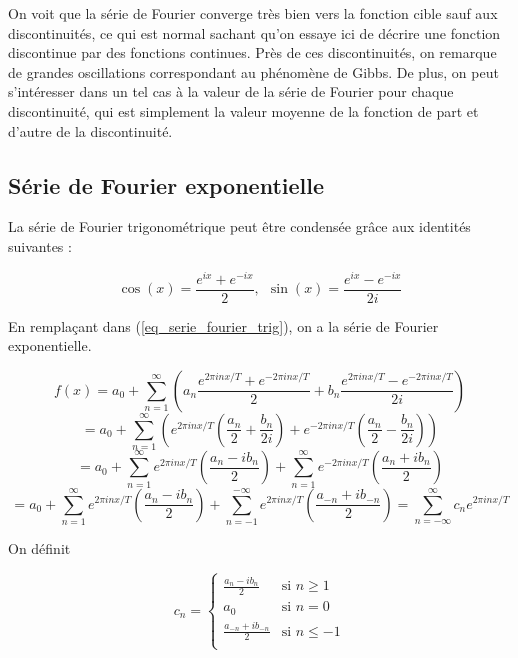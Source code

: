 On voit que la série de Fourier converge très bien vers la fonction cible sauf aux discontinuités, ce qui est normal sachant qu'on essaye ici de décrire une fonction discontinue par des fonctions continues. Près de ces discontinuités, on remarque de grandes oscillations correspondant au phénomène de Gibbs. De plus, on peut s'intéresser dans un tel cas à la valeur de la série de Fourier pour chaque discontinuité, qui est simplement la valeur moyenne de la fonction de part et d'autre de la discontinuité. 

\subsection{Série de Fourier exponentielle}
La série de Fourier trigonométrique peut être condensée grâce aux identités suivantes :

\begin{equation*}
    \cos(x) = \frac{e^{ix} + e^{-ix}}{2}, \ \ \sin(x) = \frac{e^{ix} - e^{-ix}}{2i}
\end{equation*}

En remplaçant dans (\ref{eq_serie_fourier_trig}), on a la série de Fourier exponentielle.

\begin{equation*}
    f(x) = a_0 + \sum_{n=1}^{\infty}\left(a_n \frac{e^{2\pi inx/T} + e^{-2\pi inx/T}}{2} + b_n \frac{e^{2\pi inx/T} - e^{-2\pi inx/T}}{2i}\right)
\end{equation*}
\begin{equation*}
    = a_0 + \sum_{n=1}^{\infty}\left(e^{2\pi inx/T}\left(\frac{a_n}{2} + \frac{b_n}{2i}\right) + e^{-2\pi inx/T}\left(\frac{a_n}{2} - \frac{b_n}{2i}\right)\right)
\end{equation*}
\begin{equation*}
    = a_0 + \sum_{n=1}^{\infty}e^{2\pi inx/T}\left(\frac{a_n - ib_n}{2}\right) + \sum_{n=1}^{\infty}e^{-2\pi inx/T}\left(\frac{a_n + ib_n}{2}\right)
\end{equation*}
\begin{equation}
    = a_0 + \sum_{n=1}^{\infty}e^{2\pi inx/T}\left(\frac{a_n - ib_n}{2}\right) + \sum_{n=-1}^{-\infty}e^{2\pi inx/T}\left(\frac{a_{-n} + ib_{-n}}{2}\right) = \sum_{n = -\infty}^{\infty}c_ne^{2\pi inx/T}
    \label{eq_serie_fourier_exp}
\end{equation}

On définit 

\begin{equation*}
    c_n = \begin{cases}
        \frac{a_n - ib_n}{2} & \text{si } n\geq 1\\
        a_0 & \text{si } n=0\\
        \frac{a_{-n} + ib_{-n}}{2} & \text{si } n\leq -1\\
    \end{cases}
\end{equation*}

